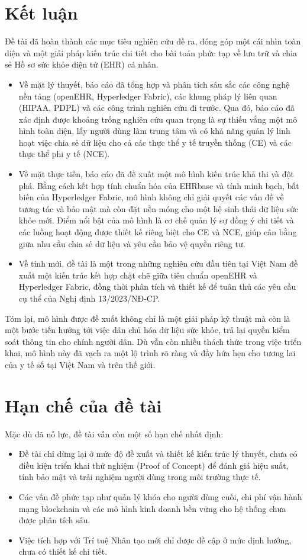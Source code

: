 \documentclass[../DoAn.tex]{subfiles}
\begin{document}
\section{Kết luận}
Đề tài đã hoàn thành các mục tiêu nghiên cứu đề ra, đóng góp một cái nhìn toàn diện và một giải pháp kiến trúc chi tiết cho bài toán phức tạp về lưu trữ và chia sẻ Hồ sơ sức khỏe điện tử (EHR) cá nhân.
\begin{itemize}
    \item Về mặt lý thuyết, báo cáo đã tổng hợp và phân tích sâu sắc các công nghệ nền tảng (openEHR, Hyperledger Fabric), các khung pháp lý liên quan (HIPAA, PDPL) và các công trình nghiên cứu đi trước. Qua đó, báo cáo đã xác định được khoảng trống nghiên cứu quan trọng là sự thiếu vắng một mô hình toàn diện, lấy người dùng làm trung tâm và có khả năng quản lý linh hoạt việc chia sẻ dữ liệu cho cả các thực thể y tế truyền thống (CE) và các thực thể phi y tế (NCE).
    \item Về mặt thực tiễn, báo cáo đã đề xuất một mô hình kiến trúc khả thi và đột phá. Bằng cách kết hợp tính chuẩn hóa của EHRbase và tính minh bạch, bất biến của Hyperledger Fabric, mô hình không chỉ giải quyết các vấn đề về tương tác và bảo mật mà còn đặt nền móng cho một hệ sinh thái dữ liệu sức khỏe mới. Điểm nổi bật của mô hình là cơ chế quản lý sự đồng ý chi tiết và các luồng hoạt động được thiết kế riêng biệt cho CE và NCE, giúp cân bằng giữa nhu cầu chia sẻ dữ liệu và yêu cầu bảo vệ quyền riêng tư.
    \item Về tính mới, đề tài là một trong những nghiên cứu đầu tiên tại Việt Nam đề xuất một kiến trúc kết hợp chặt chẽ giữa tiêu chuẩn openEHR và Hyperledger Fabric, đồng thời phân tích và thiết kế để tuân thủ các yêu cầu cụ thể của Nghị định 13/2023/NĐ-CP.
\end{itemize}
Tóm lại, mô hình được đề xuất không chỉ là một giải pháp kỹ thuật mà còn là một bước tiến hướng tới việc dân chủ hóa dữ liệu sức khỏe, trả lại quyền kiểm soát thông tin cho chính người dân. Dù vẫn còn nhiều thách thức trong việc triển khai, mô hình này đã vạch ra một lộ trình rõ ràng và đầy hứa hẹn cho tương lai của y tế số tại Việt Nam và trên thế giới.
\section{Hạn chế của đề tài}
Mặc dù đã nỗ lực, đề tài vẫn còn một số hạn chế nhất định:
\begin{itemize}
    \item Đề tài chỉ dừng lại ở mức độ đề xuất và thiết kế kiến trúc lý thuyết, chưa có điều kiện triển khai thử nghiệm (Proof of Concept) để đánh giá hiệu suất, tính bảo mật và trải nghiệm người dùng trong môi trường thực tế.
    \item Các vấn đề phức tạp như quản lý khóa cho người dùng cuối, chi phí vận hành mạng blockchain và các mô hình kinh doanh bền vững cho hệ thống chưa được phân tích sâu.
    \item Việc tích hợp với Trí tuệ Nhân tạo mới chỉ được đề cập ở mức định hướng, chưa có thiết kế chi tiết.
\end{itemize}
\end{document}
